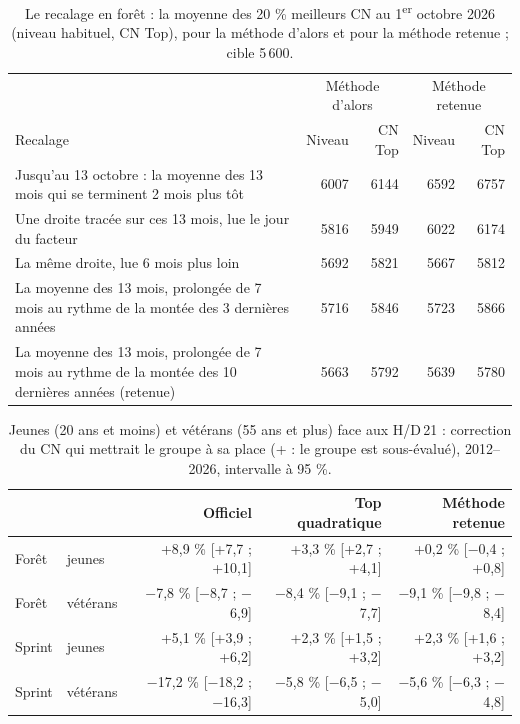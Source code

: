 \begin{table}[h]\centering\small
\caption{Le recalage en forêt : la moyenne des 20 \% meilleurs CN au 1\textsuperscript{er} octobre 2026 (niveau habituel, CN Top), pour la méthode d'alors et pour la méthode retenue ; cible 5\,600.}\label{tab:recal}
\begin{tabular}{@{}p{7.2cm}rrrr@{}}\toprule & \multicolumn{2}{c}{Méthode d'alors} & \multicolumn{2}{c}{Méthode retenue} \\ Recalage & Niveau & CN Top & Niveau & CN Top \\ \midrule
Jusqu'au 13 octobre : la moyenne des 13 mois qui se terminent 2 mois plus tôt & 6007 & 6144 & 6592 & 6757 \\
Une droite tracée sur ces 13 mois, lue le jour du facteur & 5816 & 5949 & 6022 & 6174 \\
La même droite, lue 6 mois plus loin & 5692 & 5821 & 5667 & 5812 \\
La moyenne des 13 mois, prolongée de 7 mois au rythme de la montée des 3 dernières années & 5716 & 5846 & 5723 & 5866 \\
La moyenne des 13 mois, prolongée de 7 mois au rythme de la montée des 10 dernières années (retenue) & 5663 & 5792 & 5639 & 5780 \\
\bottomrule\end{tabular}\end{table}

\begin{table}[h]\centering\small
\caption{Jeunes (20 ans et moins) et vétérans (55 ans et plus) face aux H/D\,21 : correction du CN qui mettrait le groupe à sa place (+ : le groupe est sous-évalué), 2012--2026, intervalle à 95 \%.}\label{tab:calib}
\begin{tabular}{@{}llrrr@{}}\toprule & & Officiel & Top quadratique & Méthode retenue \\ \midrule
Forêt & jeunes & +8,9 \% [+7,7 ; +10,1] & +3,3 \% [+2,7 ; +4,1] & +0,2 \% [$-$0,4 ; +0,8] \\
Forêt & vétérans & $-$7,8 \% [$-$8,7 ; $-$6,9] & $-$8,4 \% [$-$9,1 ; $-$7,7] & $-$9,1 \% [$-$9,8 ; $-$8,4] \\
Sprint & jeunes & +5,1 \% [+3,9 ; +6,2] & +2,3 \% [+1,5 ; +3,2] & +2,3 \% [+1,6 ; +3,2] \\
Sprint & vétérans & $-$17,2 \% [$-$18,2 ; $-$16,3] & $-$5,8 \% [$-$6,5 ; $-$5,0] & $-$5,6 \% [$-$6,3 ; $-$4,8] \\
\bottomrule\end{tabular}\end{table}
